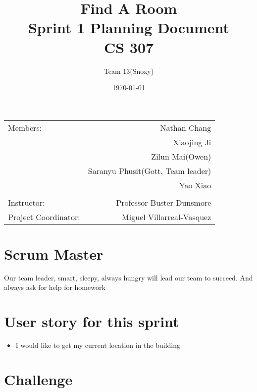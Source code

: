 \documentclass[12pt]{article}
\title{\textbf{Find A Room} \\ Sprint 1 Planning Document \\ CS 307} %
\author{Team \textsc{13}(Snoxy)} %
\date{\today} %
\begin{document}
\maketitle %

\begin{center}
\begin{tabular}{l r}
Members: & Nathan Chang \\ %
& Xiaojing Ji \\
& Zilun Mai(Owen) \\
& Saranyu Phusit(Gott, Team leader) \\
& Yao Xiao \\
\\
\bigskip
Instructor: & Professor Buster Dunsmore \\%
Project Coordinator: & Miguel Villarreal-Vasquez %

\end{tabular}
\end{center}




\newpage

\section*{Scrum Master}

Our team leader, smart, sleepy, always hungry will lead our team to succeed. And always ask for help for homework

\section*{User story for this sprint}

\begin{itemize}
\item I would like to get my current location in the building
\end{itemize}

\section*{Challenge}
\end{document}
